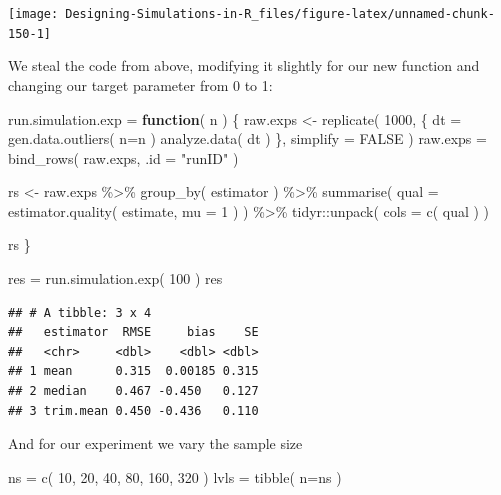 \documentclass[
]{book}
\newenvironment{Shaded}{\begin{snugshade}}{\end{snugshade}}
\newcommand{\AttributeTok}[1]{\textcolor[rgb]{0.77,0.63,0.00}{#1}}
\newcommand{\ConstantTok}[1]{\textcolor[rgb]{0.00,0.00,0.00}{#1}}
\newcommand{\ControlFlowTok}[1]{\textcolor[rgb]{0.13,0.29,0.53}{\textbf{#1}}}
\newcommand{\DecValTok}[1]{\textcolor[rgb]{0.00,0.00,0.81}{#1}}
\newcommand{\FunctionTok}[1]{\textcolor[rgb]{0.00,0.00,0.00}{#1}}
\newcommand{\NormalTok}[1]{#1}
\newcommand{\OtherTok}[1]{\textcolor[rgb]{0.56,0.35,0.01}{#1}}
\newcommand{\SpecialCharTok}[1]{\textcolor[rgb]{0.00,0.00,0.00}{#1}}
\newcommand{\StringTok}[1]{\textcolor[rgb]{0.31,0.60,0.02}{#1}}
\begin{document}
\begin{center}\texttt{[image: Designing-Simulations-in-R\_files/figure-latex/unnamed-chunk-150-1]} \end{center}

We steal the code from above, modifying it slightly for our new function and
changing our target parameter from 0 to 1:

\begin{Shaded}
\begin{Highlighting}[]
\NormalTok{run.simulation.exp }\OtherTok{=} \ControlFlowTok{function}\NormalTok{( n ) \{}
\NormalTok{    raw.exps }\OtherTok{\textless{}{-}} \FunctionTok{replicate}\NormalTok{( }\DecValTok{1000}\NormalTok{, \{}
\NormalTok{        dt }\OtherTok{=} \FunctionTok{gen.data.outliers}\NormalTok{( }\AttributeTok{n=}\NormalTok{n )}
        \FunctionTok{analyze.data}\NormalTok{( dt )}
\NormalTok{    \}, }\AttributeTok{simplify =} \ConstantTok{FALSE}\NormalTok{ )}
\NormalTok{    raw.exps }\OtherTok{=} \FunctionTok{bind\_rows}\NormalTok{( raw.exps, }\AttributeTok{.id =} \StringTok{"runID"}\NormalTok{ )}

\NormalTok{    rs }\OtherTok{\textless{}{-}}\NormalTok{ raw.exps }\SpecialCharTok{\%\textgreater{}\%}
        \FunctionTok{group\_by}\NormalTok{( estimator ) }\SpecialCharTok{\%\textgreater{}\%}
        \FunctionTok{summarise}\NormalTok{( }\AttributeTok{qual =} \FunctionTok{estimator.quality}\NormalTok{( estimate, }\AttributeTok{mu =} \DecValTok{1}\NormalTok{ ) ) }\SpecialCharTok{\%\textgreater{}\%}
\NormalTok{        tidyr}\SpecialCharTok{::}\FunctionTok{unpack}\NormalTok{( }\AttributeTok{cols =} \FunctionTok{c}\NormalTok{( qual ) )}

\NormalTok{    rs}
\NormalTok{\}}

\NormalTok{res }\OtherTok{=} \FunctionTok{run.simulation.exp}\NormalTok{( }\DecValTok{100}\NormalTok{ )}
\NormalTok{res}
\end{Highlighting}
\end{Shaded}

\begin{verbatim}
## # A tibble: 3 x 4
##   estimator  RMSE     bias    SE
##   <chr>     <dbl>    <dbl> <dbl>
## 1 mean      0.315  0.00185 0.315
## 2 median    0.467 -0.450   0.127
## 3 trim.mean 0.450 -0.436   0.110
\end{verbatim}

And for our experiment we vary the sample size

\begin{Shaded}
\begin{Highlighting}[]
\NormalTok{ns }\OtherTok{=} \FunctionTok{c}\NormalTok{( }\DecValTok{10}\NormalTok{, }\DecValTok{20}\NormalTok{, }\DecValTok{40}\NormalTok{, }\DecValTok{80}\NormalTok{, }\DecValTok{160}\NormalTok{, }\DecValTok{320}\NormalTok{ )}
\NormalTok{lvls }\OtherTok{=} \FunctionTok{tibble}\NormalTok{( }\AttributeTok{n=}\NormalTok{ns )}
\end{Highlighting}
\end{Shaded}
\end{document}
